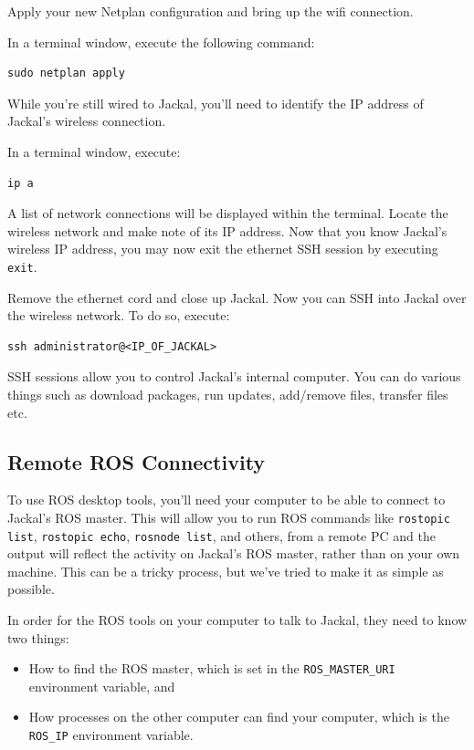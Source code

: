 \documentclass[]{clearpath-latex/clearpath-manual}
\begin{document}
Apply your new Netplan configuration and bring up the wifi connection.

In a terminal window, execute the following command:

\begin{lstlisting}
sudo netplan apply
\end{lstlisting}

While you're still wired to Jackal, you'll need to identify the IP address of Jackal's wireless connection.

In a terminal window, execute:

\begin{lstlisting}
ip a
\end{lstlisting}

A list of network connections will be displayed within the terminal. Locate the wireless network and make note of its IP address. Now that you know Jackal's wireless IP address, you may now exit the ethernet SSH session by executing \lstinline{exit}.

Remove the ethernet cord and close up Jackal.   Now you can SSH into Jackal over the wireless network.  To do so, execute:

\begin{lstlisting}
ssh administrator@<IP_OF_JACKAL>
\end{lstlisting}

SSH sessions allow you to control Jackal's internal computer.  You can do various things such as download packages, run updates, add/remove files, transfer files etc.

\subsection{Remote ROS Connectivity}\label{remote}

To use ROS desktop tools, you’ll need your computer to be able to connect to Jackal’s ROS master. This will allow you to run ROS commands like \lstinline{rostopic list}, \lstinline{rostopic echo}, \lstinline{rosnode list}, and others, from a remote PC and the output will reflect the activity on Jackal’s ROS master, rather than on your own machine.  This can be a tricky process, but we’ve tried to make it as simple as possible.

In order for the ROS tools on your computer to talk to Jackal, they need to know two things:

\begin{itemize}[nolistsep]
  \item How to find the ROS master, which is set in the \lstinline{ROS_MASTER_URI} environment variable, and
  \item How processes on the other computer can find your computer, which is the \lstinline{ROS_IP} environment variable.
\end{itemize}
\end{document}
